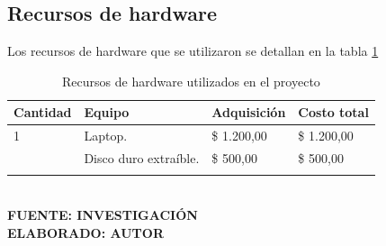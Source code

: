 \subsection{Recursos de hardware}

Los recursos de hardware que se utilizaron se detallan en la tabla \ref{tab:recursosHardware}


\begin{table}[h!]
	\centering
	\caption{Recursos de hardware utilizados en el proyecto}
	\begin{tabular}{p{2cm}p{5cm}p{3cm}p{3cm}}
		\toprule
		\textbf{Cantidad} & \textbf{Equipo} & \textbf{Adquisición} & \textbf{Costo total} \\
		\midrule
		1 & Laptop. & \$ 1.200,00 & \$ 1.200,00  \\
		\addlinespace
		1 & Disco duro extraíble. & \$ 500,00 & \$ 500,00  \\
		\addlinespace
		\bottomrule
	\end{tabular}
\label{tab:recursosHardware}
	\vspace{4mm}
	{\footnotesize \textbf{\\ FUENTE: INVESTIGACIÓN} \textbf{\\ ELABORADO: AUTOR}}
\end{table}


